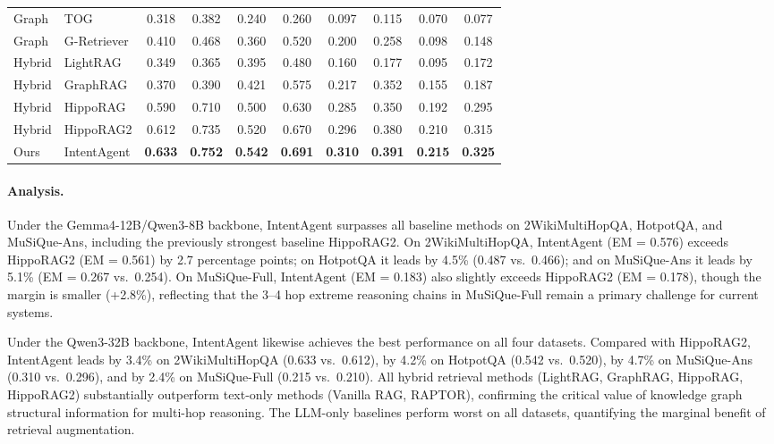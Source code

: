 \documentclass[runningheads]{llncs}
\begin{document}
\begin{table}[htbp]
{\begin{tabular}{ll|cc|cc|cc|cc}
\midrule
Graph & TOG & 0.318 & 0.382 & 0.240 & 0.260 & 0.097 & 0.115 & 0.070 & 0.077 \\
Graph & G-Retriever & 0.410 & 0.468 & 0.360 & 0.520 & 0.200 & 0.258 & 0.098 & 0.148 \\
\midrule
Hybrid & LightRAG & 0.349 & 0.365 & 0.395 & 0.480 & 0.160 & 0.177 & 0.095 & 0.172 \\
Hybrid & GraphRAG & 0.370 & 0.390 & 0.421 & 0.575 & 0.217 & 0.352 & 0.155 & 0.187 \\
Hybrid & HippoRAG & 0.590 & 0.710 & 0.500 & 0.630 & 0.285 & 0.350 & 0.192 & 0.295 \\
Hybrid & HippoRAG2 & 0.612 & 0.735 & 0.520 & 0.670 & 0.296 & 0.380 & 0.210 & 0.315 \\
\midrule
Ours & IntentAgent & \textbf{0.633} & \textbf{0.752} & \textbf{0.542} & \textbf{0.691} & \textbf{0.310} & \textbf{0.391} & \textbf{0.215} & \textbf{0.325} \\
\bottomrule
\end{tabular}
}
\end{table}

\paragraph{Analysis.}

Under the Gemma4-12B/Qwen3-8B backbone, IntentAgent surpasses all baseline methods on 2WikiMultiHopQA, HotpotQA, and MuSiQue-Ans, including the previously strongest baseline HippoRAG2. On 2WikiMultiHopQA, IntentAgent (EM = 0.576) exceeds HippoRAG2 (EM = 0.561) by 2.7 percentage points; on HotpotQA it leads by 4.5\% (0.487 vs.\ 0.466); and on MuSiQue-Ans it leads by 5.1\% (EM = 0.267 vs.\ 0.254). On MuSiQue-Full, IntentAgent (EM = 0.183) also slightly exceeds HippoRAG2 (EM = 0.178), though the margin is smaller (+2.8\%), reflecting that the 3--4 hop extreme reasoning chains in MuSiQue-Full remain a primary challenge for current systems.

Under the Qwen3-32B backbone, IntentAgent likewise achieves the best performance on all four datasets. Compared with HippoRAG2, IntentAgent leads by 3.4\% on 2WikiMultiHopQA (0.633 vs.\ 0.612), by 4.2\% on HotpotQA (0.542 vs.\ 0.520), by 4.7\% on MuSiQue-Ans (0.310 vs.\ 0.296), and by 2.4\% on MuSiQue-Full (0.215 vs.\ 0.210). All hybrid retrieval methods (LightRAG, GraphRAG, HippoRAG, HippoRAG2) substantially outperform text-only methods (Vanilla RAG, RAPTOR), confirming the critical value of knowledge graph structural information for multi-hop reasoning. The LLM-only baselines perform worst on all datasets, quantifying the marginal benefit of retrieval augmentation.
\end{document}
